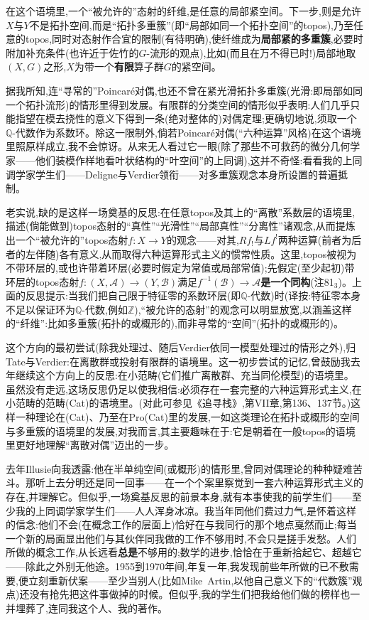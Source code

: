 在这个语境里,一个“被允许的”态射的纤维,是任意的局部紧空间。下一步,则是允许$X$与$Y$不是拓扑空间,而是“拓扑多重簇”(即“局部如同一个拓扑空间”的topos),乃至任意的topos,同时对态射作合宜的限制(有待明确),使纤维成为\textbf{局部紧的多重簇},必要时附加补充条件(也许近于佐竹的$G$-流形的观点),比如(而且在万不得已时!)局部地取$(X,G)$之形,$X$为带一个\textbf{有限}算子群$G$的紧空间。

据我所知,连“寻常的”\dmark{}Poincaré对偶,也还不曾在紧光滑拓扑多重簇(光滑:即局部如同一个拓扑流形)的情形里得到发展。有限群的分类空间的情形似乎表明:人们几乎只能指望在模去挠性的意义下得到一条(绝对整体的)对偶定理;更确切地说,须取一个$\mathbb{Q}$-代数作为系数环。除这一限制外,倘若Poincaré对偶(“六种运算”风格)在这个语境里照原样成立,我不会惊讶。从来无人看过它一眼(除了那些不可救药的微分几何学家——他们装模作样地看叶状结构的“叶空间”的上同调),这并不奇怪:看看我的上同调学家学生们——Deligne与Verdier领衔——对多重簇观念本身所设置的普遍抵制。

老实说,缺的是这样一场奠基的反思:在任意topos及其上的“离散”系数层的语境里,描述(倘能做到)topos态射的“真性”“光滑性”“局部真性”“分离性”诸观念,从而提炼出一个“被允许的”topos态射$f:X\to Y$的观念——对其,$Rf_!$与$Lf^!$两种运算(前者为后者的左伴随)各有意义,从而取得六种运算形式主义的惯常性质。这里,topos被视为不带环层的,或也许带着环层(必要时假定为常值或局部常值);先假定(至少起初)带环层的topos态射$f:(X,\mathcal{A})\to(Y,\mathcal{B})$满足$f^{-1}(\mathcal{B})\to\mathcal{A}$\textbf{是一个同构}(注81$_{3}$)。上面的反思提示:当我们把自己限于特征零的系数环层(即$\mathbb{Q}$-代数)时(译按:特征零本身不足以保证环为$\mathbb{Q}$-代数,例如$\mathbb{Z}$),“被允许的态射”的观念可以明显放宽,以涵盖这样的“纤维”:比如多重簇(拓扑的或概形的),而非寻常的“空间”(拓扑的或概形的)。

这个方向的最初尝试(除我处理过、随后Verdier依同一模型处理过的情形之外),归Tate与Verdier:在离散群或投射有限群的语境里。这一初步尝试的记忆,曾鼓励我去年继续这个方向上的反思:在小范畴(它们推广离散群、充当同伦模型)的语境里。虽然没有走远,这场反思仍足以使我相信:必须存在一套完整的六种运算形式主义,在小范畴的范畴(Cat)的语境里。(对此可参见\dmark{}《追寻栈》,第VII章,第136、137节。)这样一种理论在(Cat)、乃至在Pro(Cat)里的发展,一如这类理论在拓扑或概形的空间与多重簇的语境里的发展,对我而言,其主要趣味在于:它是朝着在一般topos的语境里更好地理解“离散对偶”迈出的一步。

去年Illusie向我透露:他在半单纯空间(或概形)的情形里,曾同对偶理论的种种疑难苦斗。那听上去分明还是同一回事——在一个个案里察觉到一套六种运算形式主义的存在,并理解它。但似乎,一场奠基反思的前景本身,就有本事使我的前学生们——至少我的上同调学家学生们——人人浑身冰凉。我当年同他们费过力气,是怀着这样的信念:他们不会(在概念工作的层面上)恰好在与我同行的那个地点戛然而止;每当一个新的局面显出他们与其伙伴同我做的工作不够用时,不会只是搓手发愁。人们所做的概念工作,从长远看\textbf{总是}不够用的;数学的进步,恰恰在于重新拾起它、超越它——除此之外别无他途。1955到1970年间,年复一年,我发现前些年所做的已不敷需要,便立刻重新伏案——至少当别人(比如Mike~Artin,以他自己意义下的“代数簇”观点)还没有抢先把这件事做掉的时候。但似乎,我的学生们把我给他们做的榜样也一并埋葬了,连同我这个人、我的著作。

